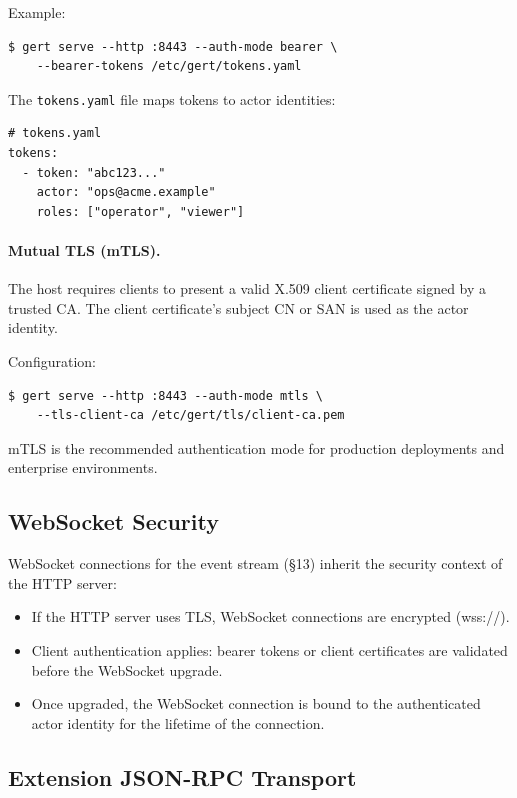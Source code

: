 Example:

\begin{verbatim}
$ gert serve --http :8443 --auth-mode bearer \
    --bearer-tokens /etc/gert/tokens.yaml
\end{verbatim}

The \texttt{tokens.yaml} file maps tokens to actor identities:

\begin{verbatim}
# tokens.yaml
tokens:
  - token: "abc123..."
    actor: "ops@acme.example"
    roles: ["operator", "viewer"]
\end{verbatim}

\paragraph{Mutual TLS (mTLS).}
The host requires clients to present a valid X.509 client certificate signed by
a trusted CA.  The client certificate's subject CN or SAN is used as the actor
identity.

Configuration:

\begin{verbatim}
$ gert serve --http :8443 --auth-mode mtls \
    --tls-client-ca /etc/gert/tls/client-ca.pem
\end{verbatim}

mTLS is the recommended authentication mode for production deployments and
enterprise environments.

\subsection{WebSocket Security}

WebSocket connections for the event stream (§13) inherit the security context
of the HTTP server:

\begin{itemize}
  \item If the HTTP server uses TLS, WebSocket connections are encrypted
        (wss://).
  \item Client authentication applies: bearer tokens or client certificates are
        validated before the WebSocket upgrade.
  \item Once upgraded, the WebSocket connection is bound to the authenticated
        actor identity for the lifetime of the connection.
\end{itemize}

\subsection{Extension JSON-RPC Transport}

